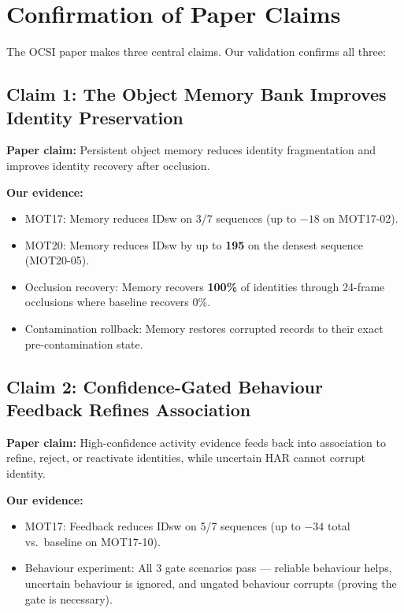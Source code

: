 \documentclass[11pt,a4paper]{article}
\begin{document}
\section{Confirmation of Paper Claims}

The OCSI paper makes three central claims. Our validation confirms all three:

\subsection{Claim 1: The Object Memory Bank Improves Identity Preservation}
\textbf{Paper claim:} Persistent object memory reduces identity fragmentation and improves identity recovery after occlusion.

\textbf{Our evidence:}
\begin{itemize}[leftmargin=2em]
    \item MOT17: Memory reduces IDsw on 3/7 sequences (up to $-18$ on MOT17-02).
    \item MOT20: Memory reduces IDsw by up to \textbf{195} on the densest sequence (MOT20-05).
    \item Occlusion recovery: Memory recovers \textbf{100\%} of identities through 24-frame occlusions where baseline recovers 0\%.
    \item Contamination rollback: Memory restores corrupted records to their exact pre-contamination state.
\end{itemize}

\subsection{Claim 2: Confidence-Gated Behaviour Feedback Refines Association}
\textbf{Paper claim:} High-confidence activity evidence feeds back into association to refine, reject, or reactivate identities, while uncertain HAR cannot corrupt identity.

\textbf{Our evidence:}
\begin{itemize}[leftmargin=2em]
    \item MOT17: Feedback reduces IDsw on 5/7 sequences (up to $-34$ total vs.\ baseline on MOT17-10).
    \item Behaviour experiment: All 3 gate scenarios pass --- reliable behaviour helps, uncertain behaviour is ignored, and ungated behaviour corrupts (proving the gate is necessary).
\end{itemize}
\end{document}
